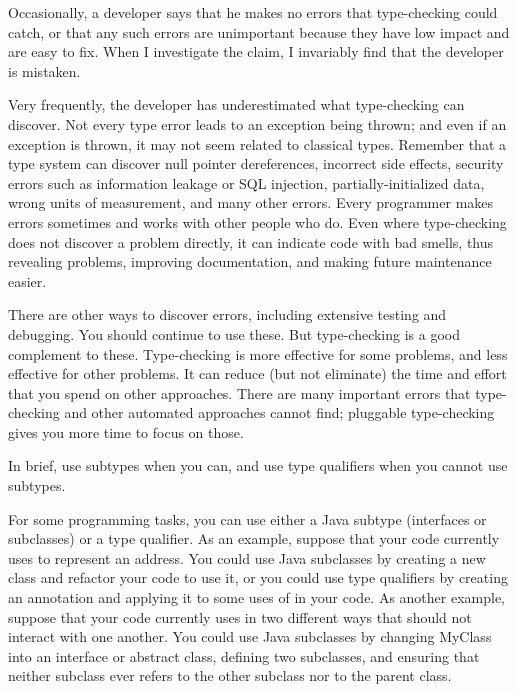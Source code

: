 

Occasionally, a developer says that he makes no errors that type-checking
could catch, or that any such errors are unimportant because they have low
impact and are easy to fix.  When I investigate the claim, I invariably
find that the developer is mistaken.

Very frequently, the developer has underestimated what type-checking can
discover.  Not every type error leads to an exception being thrown; and
even if an exception is thrown, it may not seem related to classical types.
Remember that a type system can discover
null pointer dereferences,
incorrect side effects,
security errors such as information leakage or SQL injection,
partially-initialized data,
wrong units of measurement,
and many other errors.
Every programmer makes errors sometimes and works with other people
who do.
Even where type-checking does not discover a
problem directly, it can indicate code with bad smells, thus revealing
problems, improving documentation, and making future maintenance easier.

There are other ways to discover errors, including extensive testing and
debugging.  You should continue to use these.
But type-checking is a good complement to these.  Type-checking is more
effective for some problems, and less effective for other problems.  It can
reduce (but not eliminate) the time and effort that you spend on other
approaches.  There are many important errors that type-checking and other
automated approaches cannot find; pluggable type-checking gives you more
time to focus on those.



\label{when-to-use-type-qualifiers}
\label{faq-qualifiers-vs-subclasses}

In brief, use subtypes when you can, and use type qualifiers when you cannot
use subtypes.

For some programming tasks, you can use either a Java subtype (interfaces
or subclasses) or a type
qualifier.  As an example, suppose that your code currently uses  to
represent an address.  You could use Java subclasses by creating a new
 class and refactor your code to use it, or you could use
type qualifiers by creating an  annotation and applying it
to some uses of  in your code.  As another example, suppose
that your code currently uses  in two different ways that
should not interact with one another.  You could use Java subclasses by
changing MyClass into an interface or abstract class, defining two
subclasses, and ensuring that neither subclass ever refers to the other
subclass nor to the parent class.

